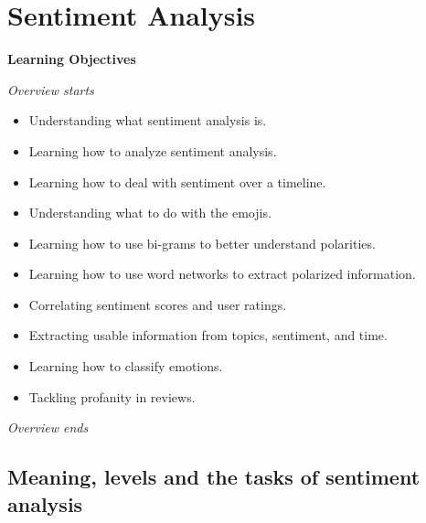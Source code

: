 \chapter{Sentiment Analysis}\label{sec-sentiment-analysis}

\textbf{Learning Objectives}

\emph{Overview starts}

\begin{itemize}
\tightlist
\item
  Understanding what sentiment analysis is.
\item
  Learning how to analyze sentiment analysis.
\item
  Learning how to deal with sentiment over a timeline.
\item
  Understanding what to do with the emojis.
\item
  Learning how to use bi-grams to better understand polarities.
\item
  Learning how to use word networks to extract polarized information.
\item
  Correlating sentiment scores and user ratings.
\item
  Extracting usable information from topics, sentiment, and time.
\item
  Learning how to classify emotions.
\item
  Tackling profanity in reviews.
\end{itemize}

\emph{Overview ends}

\section{Meaning, levels and the tasks of sentiment
analysis}\label{meaning-levels-and-tasks-of-sentiment-analysis}

